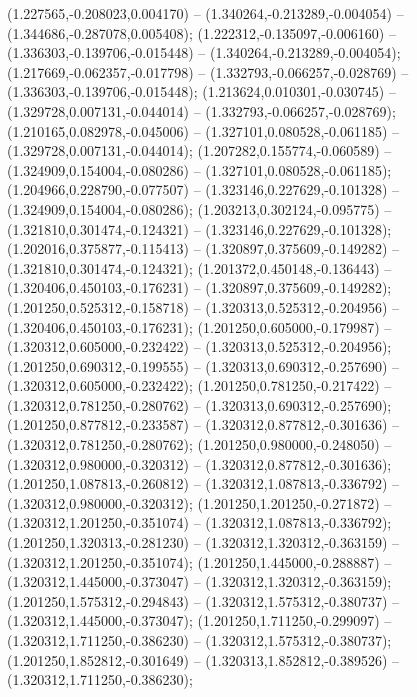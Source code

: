  (1.227565,-0.208023,0.004170) -- (1.340264,-0.213289,-0.004054) -- (1.344686,-0.287078,0.005408);
 (1.222312,-0.135097,-0.006160) -- (1.336303,-0.139706,-0.015448) -- (1.340264,-0.213289,-0.004054);
 (1.217669,-0.062357,-0.017798) -- (1.332793,-0.066257,-0.028769) -- (1.336303,-0.139706,-0.015448);
 (1.213624,0.010301,-0.030745) -- (1.329728,0.007131,-0.044014) -- (1.332793,-0.066257,-0.028769);
 (1.210165,0.082978,-0.045006) -- (1.327101,0.080528,-0.061185) -- (1.329728,0.007131,-0.044014);
 (1.207282,0.155774,-0.060589) -- (1.324909,0.154004,-0.080286) -- (1.327101,0.080528,-0.061185);
 (1.204966,0.228790,-0.077507) -- (1.323146,0.227629,-0.101328) -- (1.324909,0.154004,-0.080286);
 (1.203213,0.302124,-0.095775) -- (1.321810,0.301474,-0.124321) -- (1.323146,0.227629,-0.101328);
 (1.202016,0.375877,-0.115413) -- (1.320897,0.375609,-0.149282) -- (1.321810,0.301474,-0.124321);
 (1.201372,0.450148,-0.136443) -- (1.320406,0.450103,-0.176231) -- (1.320897,0.375609,-0.149282);
 (1.201250,0.525312,-0.158718) -- (1.320313,0.525312,-0.204956) -- (1.320406,0.450103,-0.176231);
 (1.201250,0.605000,-0.179987) -- (1.320312,0.605000,-0.232422) -- (1.320313,0.525312,-0.204956);
 (1.201250,0.690312,-0.199555) -- (1.320313,0.690312,-0.257690) -- (1.320312,0.605000,-0.232422);
 (1.201250,0.781250,-0.217422) -- (1.320312,0.781250,-0.280762) -- (1.320313,0.690312,-0.257690);
 (1.201250,0.877812,-0.233587) -- (1.320312,0.877812,-0.301636) -- (1.320312,0.781250,-0.280762);
 (1.201250,0.980000,-0.248050) -- (1.320312,0.980000,-0.320312) -- (1.320312,0.877812,-0.301636);
 (1.201250,1.087813,-0.260812) -- (1.320312,1.087813,-0.336792) -- (1.320312,0.980000,-0.320312);
 (1.201250,1.201250,-0.271872) -- (1.320312,1.201250,-0.351074) -- (1.320312,1.087813,-0.336792);
 (1.201250,1.320313,-0.281230) -- (1.320312,1.320312,-0.363159) -- (1.320312,1.201250,-0.351074);
 (1.201250,1.445000,-0.288887) -- (1.320312,1.445000,-0.373047) -- (1.320312,1.320312,-0.363159);
 (1.201250,1.575312,-0.294843) -- (1.320312,1.575312,-0.380737) -- (1.320312,1.445000,-0.373047);
 (1.201250,1.711250,-0.299097) -- (1.320312,1.711250,-0.386230) -- (1.320312,1.575312,-0.380737);
 (1.201250,1.852812,-0.301649) -- (1.320313,1.852812,-0.389526) -- (1.320312,1.711250,-0.386230);
